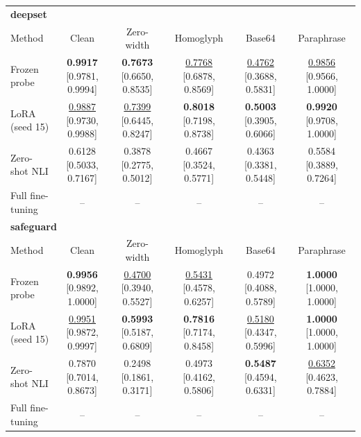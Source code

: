 \begin{tabular}{lccccc}
\toprule
\multicolumn{6}{l}{\textbf{deepset}}\\
Method & Clean & Zero-width & Homoglyph & Base64 & Paraphrase\\\midrule
Frozen probe & \textbf{0.9917} [0.9781, 0.9994] & \textbf{0.7673} [0.6650, 0.8535] & \underline{0.7768} [0.6878, 0.8569] & \underline{0.4762} [0.3688, 0.5831] & \underline{0.9856} [0.9566, 1.0000]\\
LoRA (seed 15) & \underline{0.9887} [0.9730, 0.9988] & \underline{0.7399} [0.6445, 0.8247] & \textbf{0.8018} [0.7198, 0.8738] & \textbf{0.5003} [0.3905, 0.6066] & \textbf{0.9920} [0.9708, 1.0000]\\
Zero-shot NLI & 0.6128 [0.5033, 0.7167] & 0.3878 [0.2775, 0.5012] & 0.4667 [0.3524, 0.5771] & 0.4363 [0.3381, 0.5448] & 0.5584 [0.3889, 0.7264]\\
Full fine-tuning & -- & -- & -- & -- & --\\
\midrule
\multicolumn{6}{l}{\textbf{safeguard}}\\
Method & Clean & Zero-width & Homoglyph & Base64 & Paraphrase\\\midrule
Frozen probe & \textbf{0.9956} [0.9892, 1.0000] & \underline{0.4700} [0.3940, 0.5527] & \underline{0.5431} [0.4578, 0.6257] & 0.4972 [0.4088, 0.5789] & \textbf{1.0000} [1.0000, 1.0000]\\
LoRA (seed 15) & \underline{0.9951} [0.9872, 0.9997] & \textbf{0.5993} [0.5187, 0.6809] & \textbf{0.7816} [0.7174, 0.8458] & \underline{0.5180} [0.4347, 0.5996] & \textbf{1.0000} [1.0000, 1.0000]\\
Zero-shot NLI & 0.7870 [0.7014, 0.8673] & 0.2498 [0.1861, 0.3171] & 0.4973 [0.4162, 0.5806] & \textbf{0.5487} [0.4594, 0.6331] & \underline{0.6352} [0.4623, 0.7884]\\
Full fine-tuning & -- & -- & -- & -- & --\\
\bottomrule\end{tabular}
